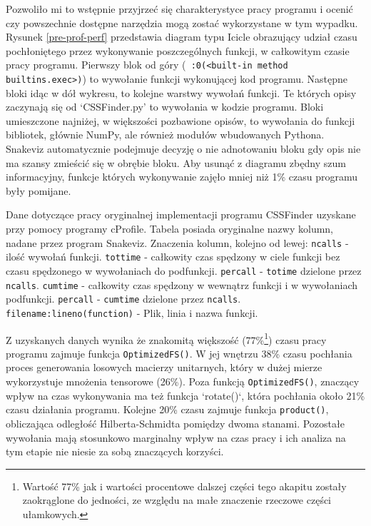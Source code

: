 \documentclass[11pt, a4paper]{article}
\newcommand{\code}[1]{\texttt{#1}}
\begin{document}
\begin{sloppypar}
    Pozwoliło mi to wstępnie przyjrzeć się charakterystyce pracy programu i ocenić czy powszechnie
    dostępne narzędzia mogą zostać wykorzystane w tym wypadku. Rysunek
    \ref{pre-prof-perf} przedstawia diagram typu Icicle obrazujący udział czasu
    pochłoniętego przez wykonywanie poszczególnych funkcji, w całkowitym czasie pracy programu.
    Pierwszy blok od góry (\code{~:0(<built-in method builtins.exec>)}) to wywołanie funkcji
    wykonującej kod programu. Następne bloki idąc w dół wykresu, to kolejne warstwy wywołań
    funkcji. Te których opisy zaczynają się od `CSSFinder.py' to wywołania w kodzie
    programu. Bloki umieszczone najniżej, w większości pozbawione opisów, to wywołania do
    funkcji bibliotek, głównie NumPy, ale również modułów wbudowanych Pythona. Snakeviz
    automatycznie podejmuje decyzję o nie adnotowaniu bloku gdy opis nie ma szansy
    zmieścić się w obrębie bloku. Aby usunąć z diagramu zbędny szum informacyjny,
    funkcje których wykonywanie zajęło mniej niż 1\% czasu programu były pomijane.

    \FloatBarrier
    \begin{table}[ht]
      \tiny
      \centering
      
      \caption{Dane dotyczące pracy oryginalnej implementacji programu CSSFinder uzyskane przy pomocy programy cProfile. Tabela posiada oryginalne nazwy kolumn, nadane przez program Snakeviz. Znaczenia kolumn, kolejno od lewej: \code{ncalls} - ilość wywołań funkcji. \code{tottime} - całkowity czas spędzony w ciele funkcji bez czasu spędzonego w wywołaniach do podfunkcji. \code{percall} - \code{totime} dzielone przez \code{ncalls}. \code{cumtime} - całkowity czas spędzony w wewnątrz funkcji i w wywołaniach podfunkcji. \code{percall} - \code{cumtime} dzielone przez \code{ncalls}. \code{filename:lineno(function)} - Plik, linia i nazwa funkcji.}
    \end{table}
    \FloatBarrier

    Z uzyskanych danych wynika że znakomitą większość (77\%\footnote{Wartość 77\% jak i
    wartości procentowe dalszej części tego akapitu zostały zaokrąglone do jedności, ze względu
    na małe znaczenie rzeczowe części ułamkowych.}) czasu pracy programu zajmuje funkcja
    \code{OptimizedFS()}. W jej wnętrzu 38\% czasu pochłania proces generowania losowych
    macierzy unitarnych, który w dużej mierze wykorzystuje mnożenia tensorowe (26\%).
    Poza funkcją \code{OptimizedFS()}, znaczący wpływ na czas wykonywania ma też funkcja
    `rotate()`, która pochłania około 21\% czasu działania programu. Kolejne 20\% czasu
    zajmuje funkcja \code{product()}, obliczająca odległość Hilberta-Schmidta pomiędzy
    dwoma stanami. Pozostałe wywołania mają stosunkowo marginalny wpływ na czas pracy i ich
    analiza na tym etapie nie niesie za sobą znaczących korzyści.


\end{sloppypar}
\end{document}
